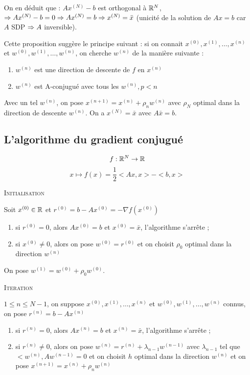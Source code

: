 On en déduit que : $Ax^{(N)}-b$ est orthogonal à $\mathbb{R}^N$, $\Rightarrow Ax^{(N)}-b=0 \Rightarrow Ax^{(N)}=b \Rightarrow x^{(N)}=\bar{x}$ (unicité de la solution de $Ax=b$ car $A$ SDP $\Rightarrow A$ inversible).

\begin{remarque}
Cette proposition suggère le principe suivant : si on connait $x^{(0)}, x^{(1)}, \dots, x^{(n)}$ et $w^{(0)}, w^{(1)}, \dots, w^{(n)}$, on cherche $w^{(n)}$ de la manière suivante :
\begin{enumerate}
\item $w^{(n)}$ est une direction de descente de $f$ en $x^{(n)}$
\item $w^{(n)}$ est A-conjugué avec tous les $w^{(n)}, p<n$
\end{enumerate}
Avec un tel $w^{(n)}$, on pose $x^{(n+1)}=x^{(n)}+\rho_nw^{(n)}$ avec $\rho_N$ optimal dans la direction de descente $w^{(n)}$. On a $x^{(N)}=\bar{x}$ avec $A\bar{x}=b$.
\end{remarque}

\subsection{L'algorithme du gradient conjugué}

\[f:\mathbb{R}^N\rightarrow \mathbb{R} \]
\[x \mapsto f(x)=\frac{1}{2}<Ax,x>-<b,x> \]

\textsc{Initialisation}

Soit $x^{(0)} \in \mathbb{R}$ et $r^{(0)}=b-Ax^{(0)}=-\nabla f(x^{(0)})$
\begin{enumerate}
\item si $r^{(0)}=0$, alors $Ax^{(0)}=b$ et $x^{(0)}=\bar{x}$, l'algorithme s'arrête ;
\item si $x^{(0)}\ne0$, alors on pose $w^{(0)}=r^{(0)}$ et on choisit $\rho_0$ optimal dans la direction $w^{(n)}$
\end{enumerate}
On pose $w^{(1)}=w^{(0)}+\rho_0w^{(0)}$.

\textsc{Iteration}

$1\leq n\leq N-1$, on suppose $x^{(0)},x^{(1)},\dots,x^{(n)}$ et $w^{(0)},w^{(1)},\dots,w^{(n)}$ connus, on pose $r^{(n)}=b-Ax^{(n)}$
\begin{enumerate}
\item si $r^{(n)}=0$, alors $Ax^{(n)}=b$ et $x^{(n)}=\bar{x}$, l'algorithme s'arrête ;
\item si $r^{(n)}\ne0$, alors on pose $w^{(n)}=r^{(n)}+\lambda_{n-1}w^{(n-1)}$ avec $\lambda_{n-1}$ tel que $<w^{(n)},Aw^{(n-1)}=0$ et on choisit $h$ optimal dans la direction $w^{(n)}$ et on pose $x^{(n+1)}=x^{(n)}+\rho_nw^{(n)}$
\end{enumerate}

